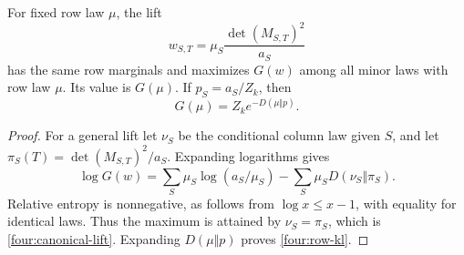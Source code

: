 \begin{lemma}\label{four:row-entropy}
For fixed row law \(\mu\), the lift
\begin{equation}\label{four:canonical-lift}
 w_{S,T}=\mu_S\frac{\det(M_{S,T})^2}{a_S}
\end{equation}
has the same row marginals and maximizes \(G(w)\) among all
minor laws with row law \(\mu\).  Its value is \(G(\mu)\).
If \(p_S=a_S/Z_k\), then
\begin{equation}\label{four:row-kl}
 G(\mu)=Z_k e^{-D(\mu\Vert p)}.
\end{equation}
\end{lemma}
\begin{proof}
For a general lift let \(\nu_S\) be the conditional column
law given \(S\), and let
\(\pi_S(T)=\det(M_{S,T})^2/a_S\).
Expanding logarithms gives
\[
 \log G(w)
 =\sum_S\mu_S\log(a_S/\mu_S)
                  -\sum_S\mu_SD(\nu_S\Vert\pi_S).
\]
Relative entropy is nonnegative, as follows from
\(\log x\leq x-1\), with equality for identical laws.
Thus the maximum is attained by \(\nu_S=\pi_S\), which is
\eqref{four:canonical-lift}.  Expanding
\(D(\mu\Vert p)\) proves \eqref{four:row-kl}.
\end{proof}

